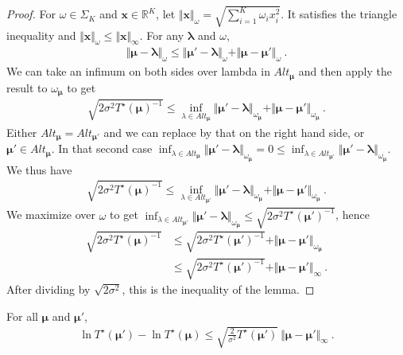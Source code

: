 \begin{proof}
For $\omega \in \Sigma_K$ and $\bm x \in \mathbb{R}^K$, let $\Vert \bm x \Vert_\omega = \sqrt{\sum_{i=1}^K \omega_i x_i^2}$.
It satisfies the triangle inequality and $\Vert \bm x \Vert_\omega \le \Vert \bm x \Vert_\infty$.
For any $\bm\lambda$ and $\omega$,
\begin{align*}
\Vert \bm\mu - \bm\lambda\Vert_\omega \le \Vert \bm\mu' - \bm\lambda\Vert_\omega + \Vert \bm\mu - \bm\mu'\Vert_\omega
\: .
\end{align*}
We can take an infimum on both sides over lambda in $Alt_{\bm\mu}$ and then apply the result to $\omega_{\bm\mu}$ to get
\begin{align*}
\sqrt{2\sigma^2 T^\star(\bm\mu)^{-1}} \le \inf_{\lambda \in Alt_{\bm\mu}}\Vert \bm\mu' - \bm\lambda\Vert_{\omega_{\bm\mu}} + \Vert \bm\mu - \bm\mu'\Vert_{\omega_{\bm\mu}}
\: .
\end{align*}
Either $Alt_{\bm\mu} = Alt_{\bm\mu'}$ and we can replace by that on the right hand side, or $\bm\mu' \in Alt_{\bm\mu}$. In that second case $\inf_{\lambda \in Alt_{\bm\mu}}\Vert \bm\mu' - \bm\lambda\Vert_{\omega_{\bm\mu}} = 0 \le \inf_{\lambda \in Alt_{\bm\mu'}}\Vert \bm\mu' - \bm\lambda\Vert_{\omega_{\bm\mu}}$. We thus have
\begin{align*}
\sqrt{2\sigma^2 T^\star(\bm\mu)^{-1}} \le \inf_{\lambda \in Alt_{\bm\mu'}}\Vert \bm\mu' - \bm\lambda\Vert_{\omega_{\bm\mu}} + \Vert \bm\mu - \bm\mu'\Vert_{\omega_{\bm\mu}}
\: .
\end{align*}
We maximize over $\omega$ to get $\inf_{\lambda \in Alt_{\bm\mu'}}\Vert \bm\mu' - \bm\lambda\Vert_{\omega_{\bm\mu}} \le \sqrt{2\sigma^2 T^\star(\bm\mu')^{-1}}$, hence
\begin{align*}
\sqrt{2\sigma^2 T^\star(\bm\mu)^{-1}}
&\le \sqrt{2\sigma^2 T^\star(\bm\mu')^{-1}} + \Vert \bm\mu - \bm\mu'\Vert_{\omega_{\bm\mu}}
\\
&\le \sqrt{2\sigma^2 T^\star(\bm\mu')^{-1}} + \Vert \bm\mu - \bm\mu'\Vert_{\infty}
\: .
\end{align*}
After dividing by $\sqrt{2\sigma^2}$, this is the inequality of the lemma.
\end{proof}


\begin{corollary}\label{cor:sub_ln_TStar_le}
For all $\bm\mu$ and $\bm\mu'$,
\begin{align*}
\ln T^\star(\bm\mu') - \ln T^\star(\bm\mu)
\le \sqrt{\frac{2}{\sigma^2}T^\star(\bm\mu')} \ \Vert \bm\mu - \bm\mu' \Vert_\infty
\: .
\end{align*}
\end{corollary}

